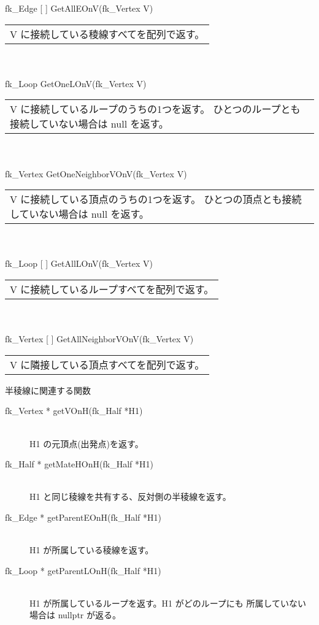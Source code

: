 \begin{tabbing}
\> fk\_Edge [ ] GetAllEOnV(fk\_Vertex V) \\
	\> \> \begin{tabular}{p{15cm}}
		V に接続している稜線すべてを配列で返す。
	\end{tabular} \\ \\

\> fk\_Loop GetOneLOnV(fk\_Vertex V) \\
	\> \> \begin{tabular}{p{15cm}}
		V に接続しているループのうちの1つを返す。
		ひとつのループとも接続していない場合は null を返す。
	\end{tabular} \\ \\

\> fk\_Vertex GetOneNeighborVOnV(fk\_Vertex V) \\
	\> \> \begin{tabular}{p{15cm}}
		V に接続している頂点のうちの1つを返す。
		ひとつの頂点とも接続していない場合は null を返す。
	\end{tabular} \\ \\

\> fk\_Loop [ ] GetAllLOnV(fk\_Vertex V) \\
	\> \> \begin{tabular}{p{15cm}}
		V に接続しているループすべてを配列で返す。
	\end{tabular} \\ \\

\> fk\_Vertex [ ] GetAllNeighborVOnV(fk\_Vertex V) \\
	\> \> \begin{tabular}{p{15cm}}
		V に隣接している頂点すべてを配列で返す。
	\end{tabular}
\end{tabbing}
\begin{center}
{\large 半稜線に関連する関数}
\end{center}
\begin{description}
 \item[\hspace*{0.6cm}fk\_Vertex * getVOnH(fk\_Half *H1)] ~ \\
	H1 の元頂点(出発点)を返す。		

 \item[\hspace*{0.6cm}fk\_Half * getMateHOnH(fk\_Half *H1)] ~ \\
	H1 と同じ稜線を共有する、反対側の半稜線を返す。		

 \item[\hspace*{0.6cm}fk\_Edge * getParentEOnH(fk\_Half *H1)] ~ \\
	H1 が所属している稜線を返す。

 \item[\hspace*{0.6cm}fk\_Loop * getParentLOnH(fk\_Half *H1)] ~ \\
	H1 が所属しているループを返す。H1 がどのループにも
	所属していない場合は nullptr が返る。
\end{description}
